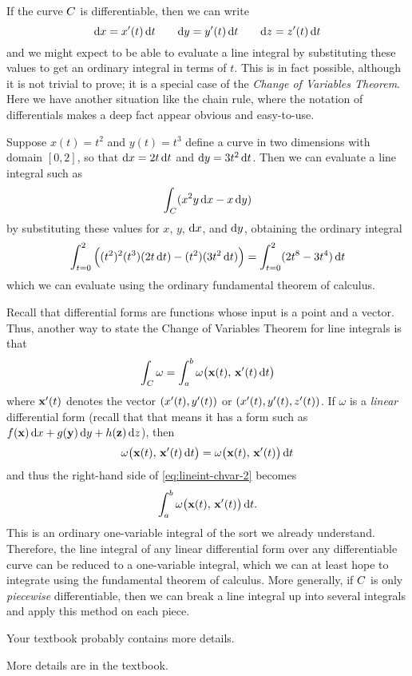 \documentclass[12pt]{amsart}
\begin{document}
If the curve $C$ is differentiable, then we can write
\[{\mathrm{d} x} = x'(t)\,{\mathrm{d} t} \qquad {\ensuremath{\mathrm{d} y}} = y'(t) \,{\mathrm{d} t} \qquad {\ensuremath{\mathrm{d} z}} = z'(t)\,{\mathrm{d} t} \]
and we might expect to be able to evaluate a line integral by substituting these values to get an ordinary integral in terms of $t$.
This is in fact possible, although it is not trivial to prove; it is a special case of the \emph{Change of Variables Theorem}.
Here we have another situation like the chain rule, where the notation of differentials makes a deep fact appear obvious and easy-to-use.

\begin{eg}
  Suppose $x(t) = t^2$ and $y(t) = t^3$ define a curve in two dimensions with domain $[0,2]$, so that ${\mathrm{d} x} = 2t\,{\mathrm{d} t}$ and ${\mathrm{d} y} = 3t^2\,{\mathrm{d} t}$.
  Then we can evaluate a line integral such as
  \[ \int_{C} (x^2 y \,{\mathrm{d} x} - x \,{\mathrm{d} y}) \]
  by substituting these values for $x$, $y$, ${\mathrm{d} x}$, and ${\mathrm{d} y}$, obtaining the ordinary integral
  \[ \int_{t=0}^2 \Big( (t^2)^2(t^3)(2t\,{\mathrm{d} t}) - (t^2)(3t^2\,{\mathrm{d} t})\Big)
  = \int_{t=0}^2 (2t^8 - 3t^4)\,{\mathrm{d} t}\]
  which we can evaluate using the ordinary fundamental theorem of calculus.
\end{eg}

Recall that differential forms are functions whose input is a point and a vector.
Thus, another way to state the Change of Variables Theorem for line integrals is that
\begin{equation}
  \int_{C} \omega = \int_a^b \omega\big(\mathbf{x}(t),\, \mathbf{x}'(t) \,{\mathrm{d} t}\big)\label{eq:lineint-chvar-2}
\end{equation}
where $\mathbf{x}'(t)$ denotes the vector $(x'(t),y'(t))$ or $(x'(t),y'(t),z'(t))$.
If $\omega$ is a \emph{linear} differential form (recall that that means it has a form such as $f(\mathbf{x})\,{\mathrm{d} x} + g(\mathbf{y})\,{\mathrm{d} y} + h(\mathbf{z})\,{\mathrm{d} z}$), then
\[ \omega\big(\mathbf{x}(t),\, \mathbf{x}'(t) \,{\mathrm{d} t}\big) = \omega\big(\mathbf{x}(t),\, \mathbf{x}'(t)\big)\,{\mathrm{d} t} \]
and thus the right-hand side of \cref{eq:lineint-chvar-2} becomes
\[ \int_a^b \omega\big(\mathbf{x}(t),\, \mathbf{x}'(t)\big)\,{\mathrm{d} t}. \]
This is an ordinary one-variable integral of the sort we already understand.
Therefore, the line integral of any linear differential form over any differentiable curve can be reduced to a one-variable integral, which we can at least hope to integrate using the fundamental theorem of calculus.
More generally, if $C$ is only \emph{piecewise} differentiable, then we can break a line integral up into several integrals and apply this method on each piece.
\begin{notextbook}Your textbook probably contains more details.\end{notextbook}
\begin{stewart}More details are in the textbook.\end{stewart}
\end{document}
